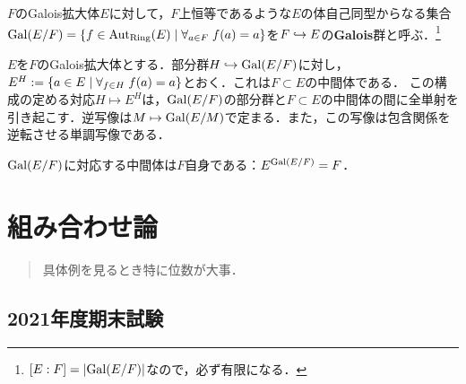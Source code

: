 \documentclass[uplatex,dvipdfmx]{jsreport}
\begin{document}
\begin{definition}
    $F$のGalois拡大体$E$に対して，$F$上恒等であるような$E$の体自己同型からなる集合$\mathrm{Gal}(E/F)=\left\{f\in\mathrm{Aut}_{\mathrm{Ring}}(E)\mid\forall_{a\in F}\;f(a)=a\right\}$を$F\hookrightarrow E$の\textbf{Galois}群と呼ぶ．\footnote{$[E:F]=\left|\mathrm{Gal}(E/F)\right|$なので，必ず有限になる．}
\end{definition}

\begin{theorem}[Galois理論の基本定理]
    $E$を$F$のGalois拡大体とする．部分群$H\hookrightarrow\mathrm{Gal}(E/F)$に対し，$E^H:=\left\{a\in E\mid\forall_{f\in H}\;f(a)=a\right\}$とおく．これは$F\subset E$の中間体である．
    この構成の定める対応$H\mapsto E^H$は，$\mathrm{Gal}(E/F)$の部分群と$F\subset E$の中間体の間に全単射を引き起こす．逆写像は$M\mapsto\mathrm{Gal}(E/M)$で定まる．また，この写像は包含関係を逆転させる単調写像である．
\end{theorem}
\begin{remarks}
    $\mathrm{Gal}(E/F)$に対応する中間体は$F$自身である：$E^{\mathrm{Gal}(E/F)}=F$．
\end{remarks}


\chapter{組み合わせ論}

\begin{quotation}
    具体例を見るとき特に位数が大事．
\end{quotation}

\section{2021年度期末試験}
\end{document}
